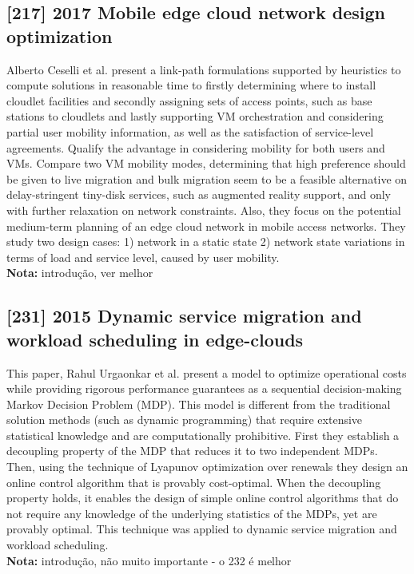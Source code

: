 \subsection{[217] 2017 Mobile edge cloud network design optimization}
\label{subsec:paper08}
Alberto Ceselli et al. \cite{ceselli2017mobile} present a link-path formulations supported by heuristics to compute solutions in reasonable time to firstly determining where to install cloudlet facilities and secondly assigning sets of access points, such as base stations to cloudlets and lastly supporting VM orchestration and considering partial user mobility information, as well as the satisfaction of service-level agreements. Qualify the advantage in considering mobility for both users and VMs. Compare two VM mobility modes, determining that high preference should be given to live migration and bulk migration seem to be a feasible alternative on delay-stringent tiny-disk services, such as augmented reality support, and only with further relaxation on network constraints. Also, they focus on the potential medium-term planning of an edge cloud network in mobile access networks. They study two design cases: 1) network in a static state 2) network state variations in terms of load and service level, caused by user mobility.\\
\textbf{Nota:} introdução, ver melhor

\subsection{[231] 2015 Dynamic service migration and workload scheduling in edge-clouds}
\label{subsec:paper09}
This paper, Rahul Urgaonkar et al. \cite{urgaonkar2015dynamic} present a model to optimize operational costs while providing rigorous performance guarantees as a sequential decision-making Markov Decision Problem (MDP). This model is different from the traditional solution methods (such as dynamic programming) that require extensive statistical knowledge and are computationally prohibitive. First they establish a decoupling property of the MDP that reduces it to two independent MDPs. Then, using the technique of Lyapunov optimization over renewals they design an online control algorithm that is provably cost-optimal. When the decoupling property holds, it enables the design of simple online control algorithms that do not require any knowledge of the underlying statistics of the MDPs, yet are provably optimal. This technique was applied to dynamic service migration and workload scheduling.\\
\textbf{Nota:} introdução, não muito importante - o 232 é melhor

